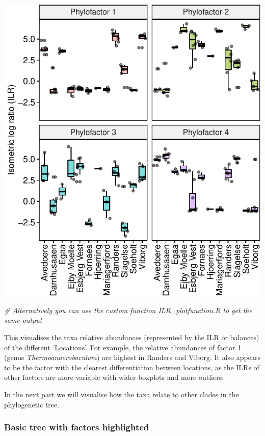 \documentclass[
]{book}
\newenvironment{Shaded}{\begin{snugshade}}{\end{snugshade}}
\newcommand{\CommentTok}[1]{\textcolor[rgb]{0.56,0.35,0.01}{\textit{#1}}}
\begin{document}
\includegraphics{gitbook-demo_files/figure-latex/pfviz1-1.pdf}

\begin{Shaded}
\begin{Highlighting}[]
\CommentTok{\# Alternatively you can use the custom function \textasciigrave{}ILR\_plotfunction.R\textasciigrave{} to get  the same output}
\end{Highlighting}
\end{Shaded}

This visualises the taxa relative abundances (represented by the ILR or balances) of the different `Locations'. For example, the relative abundances of factor 1 (genus \emph{Thermoanaerobaculum}) are highest in Randers and Viborg. It also appears to be the factor with the clearest differentiation between locations, as the ILRs of other factors are more variable with wider boxplots and more outliers.

In the next part we will visualise how the taxa relate to other clades in the phylogenetic tree.

\hypertarget{basic-tree-with-factors-highlighted}{%
\subsubsection{Basic tree with factors highlighted}\label{basic-tree-with-factors-highlighted}}
\end{document}
